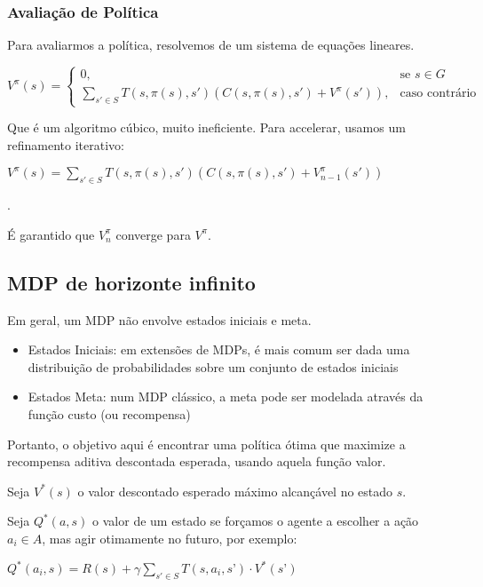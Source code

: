 \documentclass[12pt,letterpaper]{article}
\begin{document}
	\subsubsection*{Avaliação de Política}
	
	Para avaliarmos a política, resolvemos de um sistema de equações lineares.
	
	\begin{center}
		$V^\pi(s) = \left \{ \begin{matrix} 0, & \mbox{se }s \in G \\ \sum_{s' \in S}^{} T(s, \pi(s), s') (C(s, \pi(s), s') + V^\pi(s')), & \mbox{caso contrário} \end{matrix} \right.$
	\end{center}
	
	Que é um algoritmo cúbico, muito ineficiente. Para accelerar, usamos um refinamento iterativo:
	
	\begin{center}
		$V^\pi(s) =  \sum_{s' \in S}^{} T(s, \pi(s), s') (C(s, \pi(s), s') + V^\pi_{n-1}(s'))$
	\end{center}.
	
	É garantido que $V^\pi_n$ converge para $V^\pi$.
	
	\subsection*{MDP de horizonte infinito}
	
	Em geral, um MDP não envolve estados iniciais e meta.
	\begin{itemize}
		\item Estados Iniciais: em extensões de MDPs, é mais comum
		ser dada uma distribuição de probabilidades sobre um
		conjunto de estados iniciais
		\item Estados Meta: num MDP clássico, a meta pode ser
		modelada através da função custo (ou recompensa)
	\end{itemize}
	
	Portanto, o objetivo aqui é encontrar uma política ótima que maximize a recompensa aditiva descontada esperada, usando aquela função valor.
	
	Seja $V^*(s)$ o valor descontado esperado máximo alcançável no
	estado $s$.
	
	Seja $Q^*(a,s)$ o valor de um estado se forçamos o agente a
	escolher a ação $a_i \in A$, mas agir otimamente no futuro, por	exemplo:
	
	\begin{center}
		$Q^*(a_i,s)= R(s) + \gamma \sum_{s' \in S} T(s,a_i,s’)\cdot V^*(s’)$
	\end{center}
	
\end{document}
